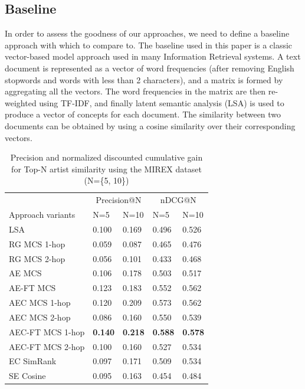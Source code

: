 \subsection{Baseline} %
In order to assess the goodness of our approaches, we need to define a baseline approach with which to compare to. The baseline used in this paper is a classic vector-based model approach used in many Information Retrieval systems. A text document is represented as a vector of word frequencies (after removing English stopwords and words with less than 2 characters), and a matrix is formed by aggregating all the vectors. The word frequencies in the matrix are then re-weighted using TF-IDF, and finally latent semantic analysis (LSA) \cite{Deerwesteretal1990} is used to produce a vector of concepts for each document. The similarity between two documents can be obtained by using a cosine similarity over their corresponding vectors.

\begin{table}[ht!]
\small
\centering
	\begin{tabular}{  lllll }
 	\toprule
& \multicolumn{2}{c}{Precision@N} & \multicolumn{2}{c}{nDCG@N} \\
\cmidrule(lr){2-3}
\cmidrule(lr){4-5}
	Approach variants & N=5 & N=10 & N=5 & N=10 \\
	\midrule
LSA & 0.100 & 0.169 & 0.496 & 0.526 \\
RG MCS 1-hop & 0.059 & 0.087 & 0.465 & 0.476 \\
RG MCS 2-hop & 0.056 & 0.101 & 0.433 & 0.468 \\
AE MCS & 0.106 & 0.178 & 0.503  & 0.517 \\
AE-FT MCS & 0.123 & 0.183 & 0.552 & 0.562 \\
AEC MCS 1-hop & 0.120 & 0.209 & 0.573 & 0.562 \\
AEC MCS 2-hop & 0.086 & 0.160 & 0.550 & 0.539 \\
AEC-FT MCS 1-hop & \textbf{0.140} & \textbf{0.218} & \textbf{0.588} & \textbf{0.578} \\
AEC-FT MCS 2-hop & 0.100 & 0.160 & 0.527 & 0.534 \\
EC SimRank & 0.097& 0.171 &  0.509 & 0.534 \\
SE Cosine & 0.095 & 0.163 & 0.454 & 0.484 \\
\bottomrule	
	\end{tabular}
	\caption{Precision and normalized discounted cumulative gain for Top-N artist similarity using the MIREX dataset (N=\{5, 10\})}	
	\label{tbl:res_mirex}
\end{table}


